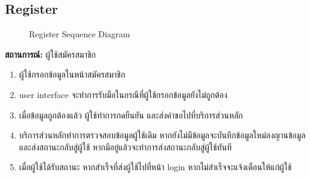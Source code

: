 \subsection{Register}
\begin{figure}[H]\centering
    \setlength{\fboxrule}{0.2mm} %
    \caption{Register Sequence Diagram}\label{fig:regisSeqDiagram}
\end{figure}
\textbf{สถานการณ์: }ผู้ใช้สมัครสมาชิก
\begin{enumerate}
    \item ผู้ใช้กรอกข้อมูลในหน้าสมัครสมาชิก
    \item user interface จะทำการรับมือในกรณีที่ผู้ใช้กรอกข้อมูลยังไม่ถูกต้อง
    \item เมื่อข้อมูลถูกต้องแล้ว ผู้ใช้ทำการกดยืนยัน และส่งคำขอไปที่บริการส่วนหลัก
    \item บริการส่วนหลักทำการตรวจสอบข้อมูลผู้ใช้เดิม หากยังไม่มีข้อมูลจะบันทึกข้อมูลใหม่ลงญานข้อมูลและส่งสถานะกลับสู่ผู้ใช้ หากมีอยู่แล้วจะทำการส่งสถานะกลับสู่ผู้ใช้ทันที
    \item เมื่อผู้ใช้ได้รับสถานะ หากสำเร็จที่ส่งผู้ใช้ไปที่หน้า login หากไม่สำเร็จจะแจ้งเตือนให้แก่ผู้ใช้
\end{enumerate}

